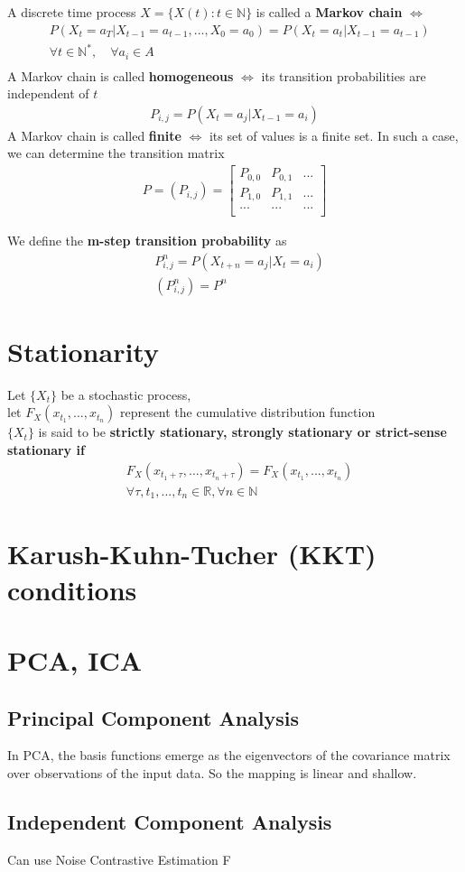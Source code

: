 \documentclass[../main.tex]{subfiles}
\begin{document}
A discrete time process $X = \{X(t): t \in \mathbb{N}\}$ is called a \textbf{Markov chain}
$\Leftrightarrow$
\begin{align*}
     & P(X_t=a_T | X_{t-1} = a_{t-1}, ..., X_0 = a_0) = P(X_t = a_t | X_{t-1} = a_{t-1}) \\
     & \forall t \in \mathbb{N}^*, \quad \forall a_i \in A                               \\
\end{align*}
A Markov chain is called \textbf{homogeneous} $\Leftrightarrow$ its transition probabilities are
independent of $t$
\begin{align*}
    P_{i,j} = P(X_t = a_j | X_{t-1} = a_i)
\end{align*}
A Markov chain is called \textbf{finite} $\Leftrightarrow$ its set of values is a finite set.
In such a case, we can determine the transition matrix
\begin{align*}
    P = (P_{i, j}) =
    \begin{bmatrix}
        P_{0,0}  & P_{0,1} & ... \\
        P_{1, 0} & P_{1,1} & ... \\
        ...      & ...     & ... \\
    \end{bmatrix}
\end{align*}

We define the \textbf{m-step transition probability} as
\begin{align*}
     & P^n_{i,j} = P(X_{t+n} = a_j | X_{t} = a_i) \\
     & (P^n_{i, j}) = P^n
\end{align*}

\section{Stationarity}
Let $\{ X_t \}$ be a stochastic process, \\
let $F_X(x_{t_1}, ..., x_{t_n})$ represent the cumulative distribution function \\
$\{ X_t \}$ is said to be \textbf{strictly stationary, strongly stationary or strict-sense stationary if}
\begin{align*}
     & F_X(x_{t_1+\tau}, ..., x_{t_n+\tau}) = F_X(x_{t_1}, ..., x_{t_n})    \\
     & \forall \tau, t_1, ..., t_n \in \mathbb{R}, \forall n \in \mathbb{N}
\end{align*}

\section{Karush-Kuhn-Tucher (KKT) conditions}


\section{PCA, ICA}
\subsection{Principal Component Analysis}
In PCA, the basis functions emerge as the eigenvectors of the covariance matrix over observations of
the input data. So the mapping is linear and shallow.

\subsection{Independent Component Analysis}
Can use Noise Contrastive Estimation
F
\end{document}
